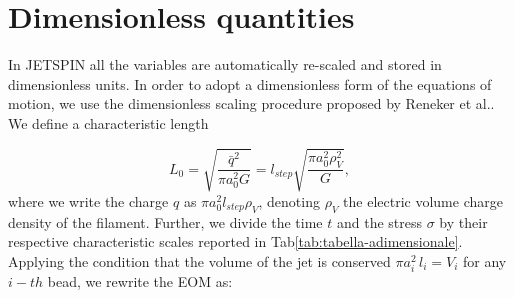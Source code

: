 \section{Dimensionless quantities\label{subsec:Introduction-of-dimensionless}}

In JETSPIN all the variables are automatically re-scaled and stored
in dimensionless units. In order to adopt a dimensionless form of
the equations of motion, we use the dimensionless scaling procedure
proposed by Reneker et al.\cite{reneker2000bending}. We define a
characteristic length

\begin{equation}
L_{0}=\sqrt{\frac{\bar{q}^{2}}{\pi a_{0}^{2}G}}=l_{step}\sqrt{\frac{\pi a_{0}^{2}\rho_{V}^{2}}{G}},\label{eq:Length-scale}
\end{equation}
where we write the charge $q$ as $\pi a_{0}^{2}l_{step}\rho_{V}$,
denoting $\rho_{V}$ the electric volume charge density of the filament.
Further, we divide the time $t$ and the stress $\sigma$ by their
respective characteristic scales reported in Tab\ref{tab:tabella-adimensionale}.
Applying the condition that the volume of the jet is conserved $\pi a_{i}^{2}\,l_{i}=V_{i}$
for any $i-th$ bead, we rewrite the EOM as:


